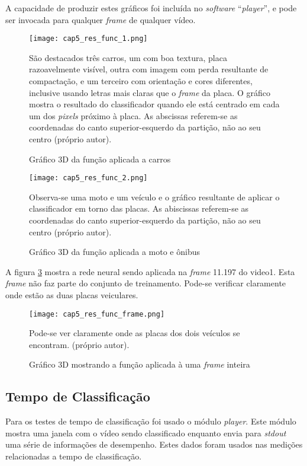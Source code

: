 A capacidade de produzir estes gráficos foi incluída no \emph{software}
``\emph{player}'', e pode ser invocada para qualquer \emph{frame} de qualquer
vídeo.

\begin{figure}[!htb]
	\centering
	\texttt{[image: cap5\_res\_func\_1.png]}
	\caption{Gráfico 3D da função aplicada a carros}
	\label{fig:cap5_res_func_1}
	São destacados três carros, um com boa textura, placa razoavelmente
	visível, outra com imagem com perda resultante de compactação, e um
	terceiro com orientação e cores diferentes, inclusive usando letras mais
	claras que o \emph{frame} da placa. O gráfico mostra o resultado do
	classificador quando ele está centrado em cada um dos \emph{pixels}
	próximo à placa.
	As abscissas referem-se as coordenadas do canto superior-esquerdo da
	partição, não ao seu centro (próprio autor).
\end{figure}

\begin{figure}[!htb]
	\centering
	\texttt{[image: cap5\_res\_func\_2.png]}
	\caption{Gráfico 3D da função aplicada a moto e ônibus}
	\label{fig:cap5_res_func_2}
	Observa-se uma moto e um veículo e o gráfico resultante de aplicar o
	classificador em torno das placas. As abiscissas referem-se as coordenadas
	do canto superior-esquerdo da partição, não ao seu centro (próprio autor).
\end{figure}

A figura \ref{fig:cap5_res_func_frame} mostra a rede neural sendo aplicada
na \emph{frame} 11.197 do video1. Esta \emph{frame} não faz parte do conjunto
de treinamento. Pode-se verificar claramente onde estão as duas placas
veiculares.

\begin{figure}[!htb]
	\centering
	\texttt{[image: cap5\_res\_func\_frame.png]}
	\caption{Gráfico 3D mostrando a função aplicada à uma \emph{frame} inteira}
	\label{fig:cap5_res_func_frame}
	Pode-se ver claramente onde as placas dos dois veículos se encontram.
	(próprio autor).
\end{figure}

\subsection{Tempo de Classificação}
Para os testes de tempo de classificação foi usado o módulo \emph{player}. Este
módulo mostra uma janela com o vídeo sendo classificado enquanto envia para
\emph{stdout} uma série de informações de desempenho. Estes dados foram
usados nas medições relacionadas a tempo de classificação.


